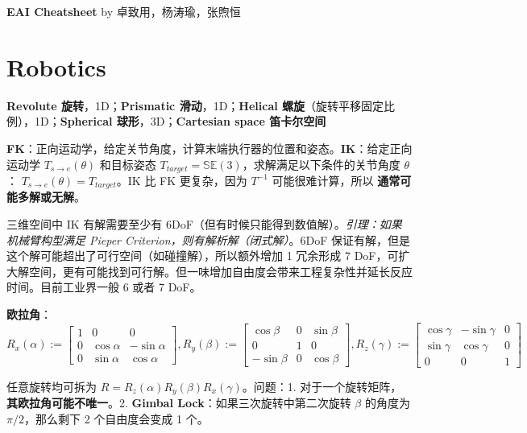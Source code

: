\documentclass[
  8pt]{extarticle}
\author{}
\date{}
\begin{document}
\begin{multicols*}{4}
    \footnotesize

    \begin{center}
        \textbf{EAI Cheatsheet} by 卓致用，杨涛瑜，张煦恒
    \end{center}
    \vspace{-1.75em} %

\hypertarget{robotics}{%
\section{Robotics}\label{robotics}}

\textbf{Revolute 旋转}，1D；\textbf{Prismatic 滑动}，1D；\textbf{Helical
螺旋}（旋转平移固定比例），1D；\textbf{Spherical
球形}，3D；\textbf{Cartesian space 笛卡尔空间}

\textbf{FK}：正向运动学，给定关节角度，计算末端执行器的位置和姿态。\textbf{IK}：给定正向运动学
\(T_{s \rightarrow e}(\theta)\) 和目标姿态
\(T_{target} = \mathbb{SE}(3)\)，求解满足以下条件的关节角度 \(\theta\)：
\(T_{s \rightarrow e}(\theta) = T_{target}\)。IK 比 FK 更复杂，因为
\(T^{-1}\) 可能很难计算，所以 \textbf{通常可能多解或无解}。

三维空间中 IK 有解需要至少有
6DoF（但有时候只能得到数值解）。\emph{引理：如果机械臂构型满足 Pieper
Criterion，则有解析解（闭式解）}。6DoF
保证有解，但是这个解可能超出了可行空间（如碰撞解），所以额外增加 1
冗余形成 7
DoF，可扩大解空间，更有可能找到可行解。但一味增加自由度会带来工程复杂性并延长反应时间。目前工业界一般
6 或者 7 DoF。

\textbf{欧拉角}：\(R_{x}(\alpha):=\begin{bmatrix}1&0&0\\0&\cos\alpha&-\sin\alpha\\0&\sin\alpha&\cos\alpha\end{bmatrix}, R_{y}(\beta):=\begin{bmatrix}\cos\beta&0&\sin\beta\\0&1&0\\-\sin\beta&0&\cos\beta\end{bmatrix}, R_{z}(\gamma):=\begin{bmatrix}\cos\gamma&-\sin\gamma&0\\\sin\gamma&\cos\gamma&0\\0&0&1\end{bmatrix}\)

任意旋转均可拆为 \(R=R_{z}(\alpha)R_{y}(\beta)R_{x}(\gamma)\)。问题：1.
对于一个旋转矩阵，\textbf{其欧拉角可能不唯一}。2. \textbf{Gimbal
Lock}：如果三次旋转中第二次旋转 \(\beta\) 的角度为 \(\pi/2\)，那么剩下 2
个自由度会变成 1 个。


\end{multicols*}
\end{document}
